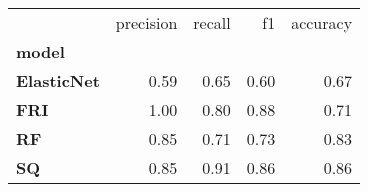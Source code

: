 \begin{tabular}{lrrrr}
\toprule
{} &  precision &  recall &   f1 &  accuracy \\
\textbf{model     } &            &         &      &           \\
\midrule
\textbf{ElasticNet} &       0.59 &    0.65 & 0.60 &      0.67 \\
\textbf{FRI       } &       1.00 &    0.80 & 0.88 &      0.71 \\
\textbf{RF        } &       0.85 &    0.71 & 0.73 &      0.83 \\
\textbf{SQ        } &       0.85 &    0.91 & 0.86 &      0.86 \\
\bottomrule
\end{tabular}
